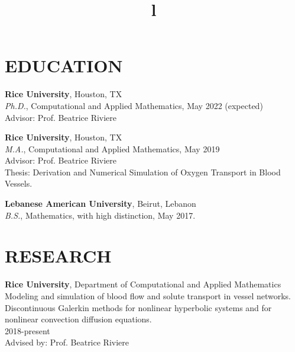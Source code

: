 \documentclass[margin]{res}
\begin{document}
\begin{resume}

\section{EDUCATION}
\textbf{Rice University}, Houston, TX\\
{\sl Ph.D.}, Computational and Applied Mathematics, May 2022 (expected)\\
Advisor: Prof. Beatrice Riviere 

\par
\textbf{Rice University}, Houston, TX\\
{\sl M.A.}, Computational and Applied Mathematics, May 2019\\
Advisor:  Prof. Beatrice Riviere \\
Thesis: Derivation and Numerical Simulation of Oxygen Transport in Blood Vessels. 

\par
\textbf{Lebanese American University}, Beirut, Lebanon \\
{\sl B.S.}, Mathematics, with high distinction, May 2017. 
\section{RESEARCH}
\par
\textbf{Rice University}, Department of Computational and Applied Mathematics \\
Modeling and simulation of blood flow and solute transport in vessel networks.  
\\ Discontinuous Galerkin methods for nonlinear hyperbolic systems and for nonlinear convection diffusion equations. \\
2018-present\\
Advised by: Prof. Beatrice Riviere


\begin{format}
\title{l}\\
\\
\body\\
\end{format}


\end{resume}
\end{document}
